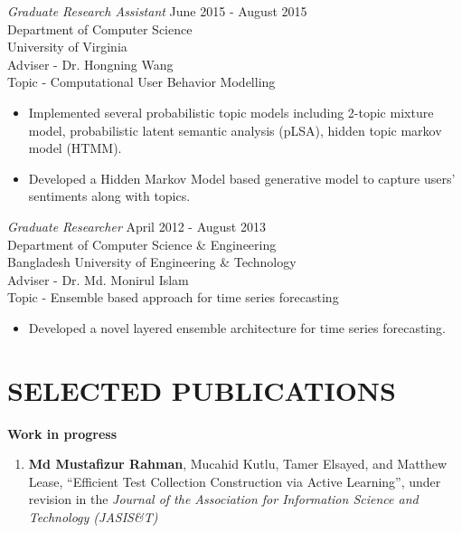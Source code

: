 \documentclass[11pt]{res}
\begin{document}
\begin{resume}
\begin{itemize}
\end{itemize}

{\sl Graduate Research Assistant} \hfill        June 2015 - August 2015 \\
Department of Computer Science\\
University of Virginia\\
Adviser - Dr. Hongning Wang \\
Topic - Computational User Behavior Modelling

   \begin{itemize} \itemsep -2pt %
   \item Implemented several probabilistic topic models including 2-topic mixture model, probabilistic latent semantic analysis (pLSA), hidden topic markov model (HTMM).
   \item Developed a Hidden Markov Model based generative model to capture users' sentiments along with topics.
\end{itemize}

{\sl  Graduate Researcher}  \hfill  April 2012 - August 2013 \\
Department of Computer Science \& Engineering\\
Bangladesh University of Engineering \& Technology\\
Adviser - Dr. Md. Monirul Islam \\
Topic - Ensemble based approach for time series forecasting
 \begin{itemize} \itemsep -2pt
  \item  Developed a novel layered ensemble architecture for time series forecasting.
\end{itemize} \vspace{-6pt}

\vspace{0.1in}

\section{SELECTED PUBLICATIONS}
\vspace{-2pt}

{\large \bf Work in progress} 
\vspace{2pt}
\begin{enumerate} \itemsep -2pt
\item \textbf{Md Mustafizur Rahman}, Mucahid Kutlu, Tamer Elsayed, and Matthew Lease, ``Efficient Test Collection Construction via Active Learning'', under revision in the {\it Journal of the Association for Information Science and Technology (JASIS\&T)} 


\end{enumerate}
\end{resume}
\end{document}

